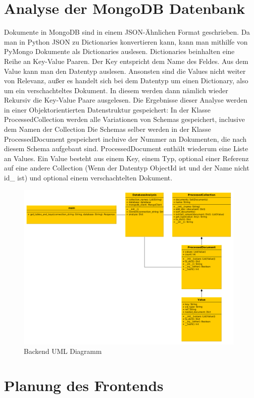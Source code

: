 \section{Analyse der MongoDB Datenbank}
\label{sec:mongoDB_analyse}

Dokumente in MongoDB sind in einem JSON-Ähnlichen Format geschrieben.
Da man in Python JSON zu Dictionaries konvertieren kann, kann man mithilfe von PyMongo Dokumente als Dictionaries auslesen.
Dictionaries beinhalten eine Reihe an Key-Value Paaren.
Der Key entspricht dem Name des Feldes.
Aus dem Value kann man den Datentyp auslesen.
Ansonsten sind die Values nicht weiter von Relevanz, außer es handelt sich bei dem Datentyp um einen Dictionary, also um ein verschachteltes Dokument.
In diesem werden dann nämlich wieder Rekursiv die Key-Value Paare ausgelesen.
Die Ergebnisse dieser Analyse werden in einer Objektorientierten Datenstruktur gespeichert:
In der Klasse ProcessedCollection werden alle Variationen von Schemas gespeichert, inclusive dem Namen der Collection 
Die Schemas selber werden in der Klasse ProcessedDocument gespeichert incluive der Nummer an Dokumenten, die nach diesem Schema aufgebaut sind.
ProcessedDocument enthält wiederum eine Liste an Values.
Ein Value besteht aus einem Key, einem Typ, optional einer Referenz auf eine andere Collection (Wenn der Datentyp ObjectId ist und der Name nicht id\_ ist) und optional einem verschachtelten Dokument.

\begin{figure}[H]
    \includegraphics[width=\textwidth]{images/backend_uml}
    \caption{Backend UML Diagramm}
    \label{fig:backend_uml}
\end{figure}

\section{Planung des Frontends}
\label{sec:planung_frontend}
